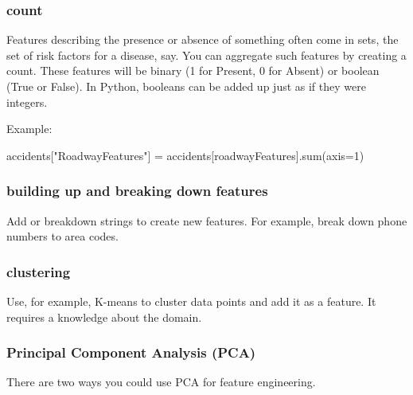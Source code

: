 \documentclass[12pt]{report}
\begin{document}
\subsubsection{count}
Features describing the presence or absence of something often come in sets, the set of risk factors for a disease, say. You can aggregate such features by creating a count. These features will be binary (1 for Present, 0 for Absent) or boolean (True or False). In Python, booleans can be added up just as if they were integers.

Example:

accidents["RoadwayFeatures"] = accidents[roadwayFeatures].sum(axis=1)

\subsubsection{building up and breaking down features}
Add or breakdown strings to create new features. For example, break down phone numbers to area codes.

\subsubsection{clustering}
Use, for example, K-means to cluster data points and add it as a feature. It requires a knowledge about the domain.


\subsubsection{Principal Component Analysis (PCA)}
There are two ways you could use PCA for feature engineering.
\end{document}
